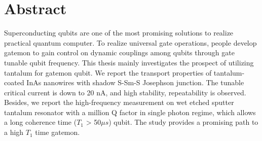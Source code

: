 \section{Abstract}
Superconducting qubits are one of the most promising solutions to realize practical quantum computer. To realize universal gate operations, people develop gatemon to gain control on dynamic couplings among qubits through gate tunable qubit frequency. This thesis mainly investigates the prospect of utilizing tantalum for gatemon qubit. We report the transport properties of tantalum-coated InAs nanowires with shadow S-Sm-S Josephson junction. The tunable critical current is down to 20 nA, and high stability, repeatability is observed. Besides, we report the high-frequency measurement on wet etched sputter tantalum resonator with a million Q factor in single photon regime, which allows a long coherence time ($T_1$ > 50$\mu s$) qubit. The study provides a promising path to a high $T_1$ time gatemon.
\newpage
{}